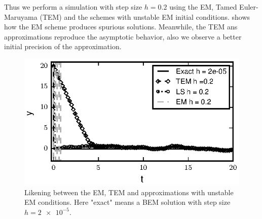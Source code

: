 \begin{example}
\begin{enumerate}[(i)]
	\end{enumerate}
	Thus we perform a simulation with step size $h=\num{0.2}$  using 
	the EM, Tamed Euler-Maruyama (TEM) and the \SM schemes with unstable EM initial conditions. 
	 shows how the EM scheme produces spurious solutions. Meanwhile, the TEM ans \SM 
	approximations
	reproduce the asymptotic behavior, also we observe a better initial precision of the \SM approximation. 
	\begin{figure}[h]
		\begin{center}
			\includegraphics{papers/paperB/figures/ApplebyEx}
		\end{center}
		\caption{Likening between the EM, TEM and \SM approximations with unstable EM conditions. Here "exact" means
			a BEM solution with step size $h=\num{2e-5}$.}
		\label{fig:pathsAppleby}
	\end{figure}
\end{example}

